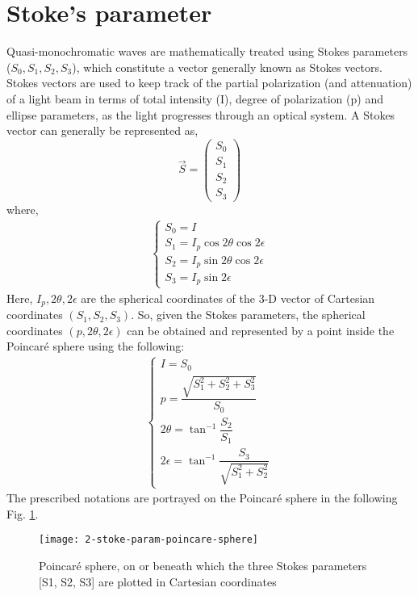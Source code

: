 \documentclass[../report.tex]{subfiles}
\begin{document}
		\section{Stoke's parameter} 		
Quasi-monochromatic waves are mathematically treated using Stokes parameters ($S_0,S_1,S_2,S_3$), which constitute a vector generally known as Stokes vectors. Stokes vectors are used to keep track of the partial polarization (and attenuation) of a light beam in terms of total intensity (I), degree of polarization (p) and ellipse parameters, as the light progresses through an optical system. A Stokes vector can generally be represented as,
\begin{equation}\label{eq:stokes_vector}
\overrightarrow {S} = \left(\begin{matrix}  
	S_0 \\
	S_1 \\
	S_2 \\
	S_3
\end{matrix} \right) 
\end{equation}
where,
\begin{equation}\label{eq:stokes_parameters}
\begin{aligned}
\begin{cases}
S_{0}=I\\ 
S_{1}=I_{p}\cos 2\theta \cos 2\epsilon \\
S_{2}=I_{p}\sin 2\theta \cos 2\epsilon \\
S_{3}=I_{p}\sin 2\epsilon
\end{cases}
\end{aligned}
\end{equation}
Here, $I_p, 2\theta, 2\epsilon$ are the spherical coordinates of the 3-D vector of Cartesian coordinates $(S_1,S_2,S_3)$. So, given the Stokes parameters, the spherical coordinates $(p,2\theta,2\epsilon)$ can be obtained and represented by a point inside the Poincaré sphere using the following:
\begin{equation}\label{eq:stokes_spherical_coordinates}
\begin{aligned}
\begin{cases}
I = S_{0}\\ 
p = \dfrac {\sqrt {S_{1}^{2}+S_{2}^{2}+S_{3}^{2}}} {S_{0}} \\
2\theta = \tan^{-1}\dfrac {S_{2}} {S_{1}} \\
2\epsilon = \tan ^{-1}\dfrac {S_{3}} {\sqrt {S_{1}^{2}+S_{2}^{2}}}
\end{cases}
\end{aligned}
\end{equation}
The prescribed notations are portrayed on the Poincaré sphere in the following Fig. \ref{fig:2_stoke_param_poincare_sphere}.    
\begin{figure}[H]
	\centering
	\texttt{[image: 2-stoke-param-poincare-sphere]}
	\caption{Poincaré sphere, on or beneath which the three Stokes parameters [S1, S2, S3] are plotted in Cartesian coordinates \cite{stoke_poincare_parameter}}
	\label{fig:2_stoke_param_poincare_sphere}
\end{figure}
\end{document}
